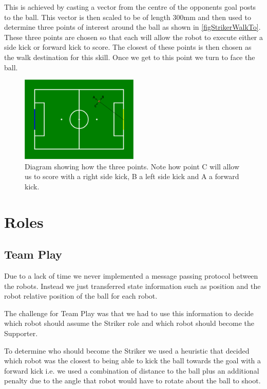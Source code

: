 \documentclass[pdftex,11pt,a4paper]{report}
\begin{document}
This is achieved by casting a vector from the centre of the opponents goal posts to the ball. This vector is then scaled to be of length 300mm and then used to determine three points of interest around the ball as shown in \autoref{figStrikerWalkTo}. These three points are chosen so that each will allow the robot to execute either a side kick or forward kick to score. The closest of these points is then chosen as the walk destination for this skill. Once we get to this point we turn to face the ball.


\begin{figure}[ht]
\centering
\includegraphics[width=0.5\textwidth]{figures/strikerWalkTo}
\caption{Diagram showing how the three points. Note how point C will allow us to score with a right side kick, B a left side kick and A a forward kick.} \label{figStrikerWalkTo}
\end{figure} 




\section{Roles}

\subsection{Team Play}
Due to a lack of time we never implemented a message passing protocol between the robots. Instead we just transferred state information such as position and the robot relative position of the ball for each robot.

The challenge for Team Play was that we had to use this information to decide which robot should assume the Striker role and which robot should become the Supporter.

To determine who should become the Striker we used a heuristic that decided which robot was the closest to being able to kick the ball towards the goal with a forward kick i.e. we used a combination of distance to the ball plus an additional penalty due to the angle that robot would have to rotate about the ball to shoot. 
\end{document}
